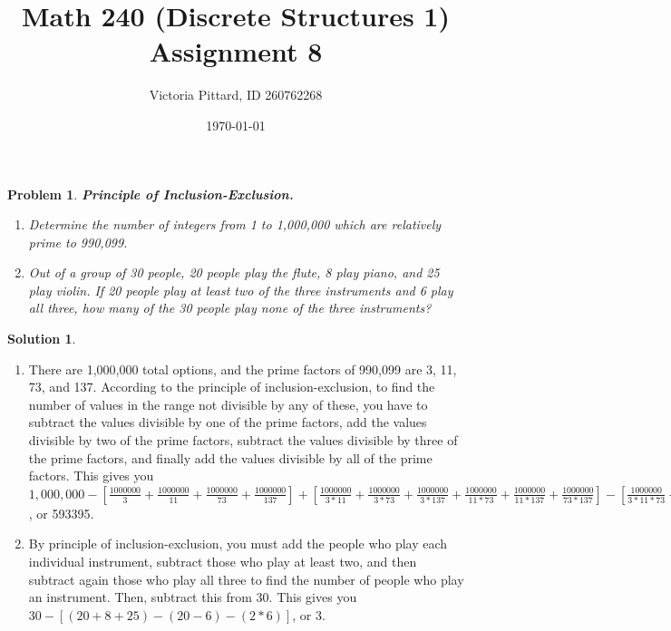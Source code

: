 \documentclass{article}
\newtheorem{problem}{Problem}
\theoremstyle{definition}
\newtheorem*{solution}{Solution}
\begin{document}
\title{Math 240 (Discrete Structures 1) Assignment 8}
\author{Victoria Pittard, ID 260762268}
\date{\today}

\maketitle

\begin{problem}\textbf{Principle of Inclusion-Exclusion.}
\begin{enumerate}[label = \alph*)]
    \item Determine the number of integers from 1 to 1,000,000 which are relatively prime to 990,099.
    
    \item Out of a group of 30 people, 20 people play the flute, 8 play piano, and 25 play violin. If 20 people play at least two of the three instruments and 6 play all three, how many of the 30 people play none of the three instruments?
\end{enumerate}
\end{problem}

\begin{solution}
\end{solution}
\begin{enumerate}[label = \alph*)]
    \item There are 1,000,000 total options, and the prime factors of 990,099 are 3, 11, 73, and 137. According to the principle of inclusion-exclusion, to find the number of values in the range not divisible by any of these, you have to subtract the values divisible by one of the prime factors, add the values divisible by two of the prime factors, subtract the values divisible by three of the prime factors, and finally add the values divisible by all of the prime factors. This gives you $1,000,000 - [\frac{1000000}{3} + \frac{1000000}{11} + \frac{1000000}{73} + \frac{1000000}{137}] + [\frac{1000000}{3*11}+\frac{1000000}{3*73}+\frac{1000000}{3*137}+\frac{1000000}{11*73}+\frac{1000000}{11*137}+\frac{1000000}{73*137}] - [\frac{1000000}{3*11*73}+\frac{1000000}{3*11*137}+\frac{1000000}{3*73*37}+\frac{1000000}{11*73*37}]+[\frac{1000000}{3*11*73*137}]$, or 593395.
    
    \item By principle of inclusion-exclusion, you must add the people who play each individual instrument, subtract those who play at least two, and then subtract again those who play all three to find the number of people who play an instrument. Then, subtract this from 30. This gives you $30-[(20+8+25)-(20-6)-(2*6)]$, or 3.
\end{enumerate}
\end{document}
